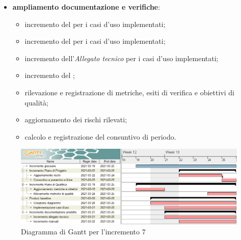 \begin{itemize}
\begin{itemize}
\end{itemize}

\item \textbf{ampliamento documentazione e verifiche}:
\begin{itemize}
\item incremento del \textit{\MU{}} per i casi d'uso implementati;
\item incremento del \textit{\MM{}} per i casi d'uso implementati;
\item incremento dell'\textit{Allegato tecnico} per i casi d'uso implementati;
\item incremento del ;
\item rilevazione e registrazione di metriche, esiti di verifica e obiettivi di qualità;
\item aggiornamento dei rischi rilevati;
\item calcolo e registrazione del consuntivo di periodo.
\end{itemize}

\end{itemize}
\begin{figure}[H]
\centering

\centerline{\includegraphics[scale=0.6]{res/Pianificazione/Fasi/CodificaIncrementi/ganttIncremento7}}
\caption{Diagramma di Gantt per l'incremento 7}
\end{figure}